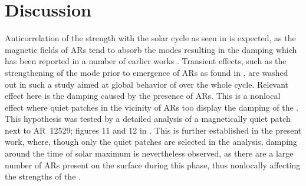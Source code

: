 \documentclass{aa}
\begin{document}

\section{Discussion}

Anticorrelation of the \fff strength with the solar cycle as seen in 
is expected, as the magnetic fields of ARs tend to absorb the modes resulting in the
\fff damping which has been reported in a number of earlier works
\citep{Cally+94,CB97,SRB16}. Transient effects, such as the strengthening of the mode
prior to emergence of ARs as found in \citet{SRB16}, are washed out in such a study aimed
at global behavior of \fff over the whole cycle. Relevant effect here is the damping
caused by the presence of ARs. This is a nonlocal effect where quiet patches in the
vicinity of ARs too display the damping of the \fff. This hypothesis was tested
by a detailed analysis of a magnetically quiet patch next to AR~12529; figures 11 and 12
in \citet{SRB16}. This is further established in the present work, where, though only the
quiet patches are selected in the analysis, damping around the time of solar maximum is
nevertheless observed, as there are a large number of ARs present on the surface during this
phase, thus nonlocally affecting the strengths of the \fff.

\end{document}
